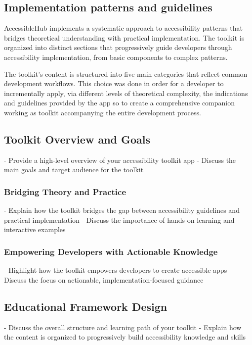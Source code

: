 \subsection{Implementation patterns and guidelines}

AccessibleHub implements a systematic approach to accessibility patterns that bridges theoretical understanding with practical implementation. The toolkit is organized into distinct sections that progressively guide developers through accessibility implementation, from basic components to complex patterns.

The toolkit's content is structured into five main categories that reflect common development workflows. This choice was done in order for a developer to incrementally apply, via different levels of theoretical complexity, the indications and guidelines provided by the app so to create a comprehensive companion working as toolkit accompanying the entire development process. 

\subsection{Toolkit Overview and Goals}
- Provide a high-level overview of your accessibility toolkit app
- Discuss the main goals and target audience for the toolkit

\subsubsection{Bridging Theory and Practice}
- Explain how the toolkit bridges the gap between accessibility guidelines and practical implementation
- Discuss the importance of hands-on learning and interactive examples

\subsubsection{Empowering Developers with Actionable Knowledge}
- Highlight how the toolkit empowers developers to create accessible apps
- Discuss the focus on actionable, implementation-focused guidance

\subsection{Educational Framework Design}
- Discuss the overall structure and learning path of your toolkit
- Explain how the content is organized to progressively build accessibility knowledge and skills

